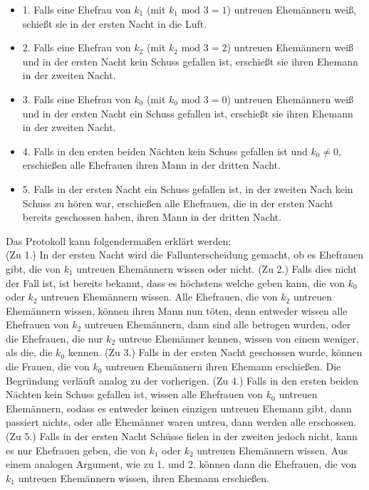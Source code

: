 \begin{itemize}
	\item 1. Falls eine Ehefrau von $k_1$ (mit $k_1 \text{ mod } 3 = 1$) untreuen Ehemännern weiß, schießt sie in der ersten Nacht in die Luft.
	\item 2. Falls eine Ehefrau von $k_2$ (mit $k_2 \text{ mod } 3 = 2$) untreuen Ehemännern weiß und in der ersten Nacht kein Schuss gefallen ist, erschießt sie ihren Ehemann in der zweiten Nacht.
	\item 3. Falls eine Ehefrau von $k_0$ (mit $k_0 \text{ mod } 3 = 0$) untreuen Ehemännern weiß und in der ersten Nacht ein Schuss gefallen ist, erschießt sie ihren Ehemann in der zweiten Nacht.
	\item 4. Falls in den ersten beiden Nächten kein Schuss gefallen ist und $k_0 \ne0$, erschießen alle Ehefrauen ihren Mann in der dritten Nacht.
	\item 5. Falls in der ersten Nacht ein Schuss gefallen ist, in der zweiten Nach kein Schuss zu hören war, erschießen alle Ehefrauen, die in der ersten Nacht bereits geschossen haben, ihren Mann in der dritten Nacht. 
\end{itemize}
Das Protokoll kann folgendermaßen erklärt werden:\\
(Zu 1.) In der ersten Nacht wird die Fallunterscheidung gemacht, ob es Ehefrauen gibt, die von $k_1$ untreuen Ehemännern wissen oder nicht.
(Zu 2.) Falls dies nicht der Fall ist, ist bereits bekannt, dass es höchstens welche geben kann, die von $k_0$ oder $k_2$ untreuen Ehemännern wissen. Alle Ehefrauen, die von $k_2$ untreuen Ehemännern wissen, können ihren Mann nun töten, denn entweder wissen alle Ehefrauen von $k_2$ untreuen Ehemännern, dann sind alle betrogen wurden, oder die Ehefrauen, die nur $k_2$ untreue Ehemänner kennen, wissen von einem weniger, als die, die $k_0$ kennen.
(Zu 3.) Falls in der ersten Nacht geschossen wurde, können die Frauen, die von $k_0$ untreuen Ehemännern ihren Ehemann erschießen. Die Begründung verläuft analog zu der vorherigen.
(Zu 4.) Falls in den ersten beiden Nächten kein Schuss gefallen ist, wissen alle Ehefrauen von $k_0$ untreuen Ehemännern, sodass es entweder keinen einzigen untreuen Ehemann gibt, dann passiert nichts, oder alle Ehemänner waren untreu, dann werden alle erschossen.
(Zu 5.) Falls in der ersten Nacht Schüsse fielen in der zweiten jedoch nicht, kann es nur Ehefrauen geben, die von $k_1$ oder $k_2$ untreuen Ehemännern wissen. Aus einem analogen Argument, wie zu 1. und 2. können dann die Ehefrauen, die von $k_1$ untreuen Ehemännern wissen, ihren Ehemann erschießen.\\

